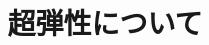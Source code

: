 \documentclass[11pt]{jsarticle}
\begin{document}
	\title{超弾性について}
	\maketitle
	\newpage
	
	
	
\end{document}
